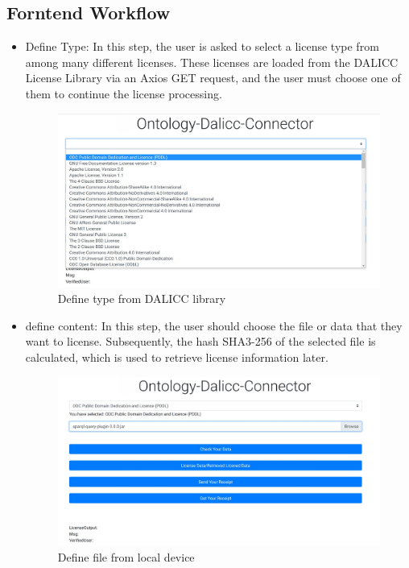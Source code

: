 \subsection{Forntend Workflow}
\begin{itemize}
	\item Define Type:
    In this step, the user is asked to select a license type from among many different licenses. These licenses are loaded from the DALICC License Library via an Axios GET request, and the user must choose one of them to continue the license processing.
 \begin{center}
	\begin{figure}[htb!]
		
		\begin{minipage}{0.45\linewidth}
			\centering
			\includegraphics[width=1.95\textwidth]{images/chap03_selectType.jpg}
		\end{minipage}
		\caption[Define type from DALICC library]{Define type from DALICC library}
		
	\end{figure}
	
\end{center}
	\item define content:
    In this step, the user should choose the file or data that they want to license. Subsequently, the hash SHA3-256 of the selected file is calculated, which is used to retrieve license information later.
 \begin{center}
	\begin{figure}[htb!]
		
		\begin{minipage}{0.45\linewidth}
			\centering
			\includegraphics[width=1.95\textwidth]{images/chap03_selectFile.jpg}
		\end{minipage}
		\caption[Define file from local device]{Define file from local device}
		

\end{figure}
\end{center}
\end{itemize}
